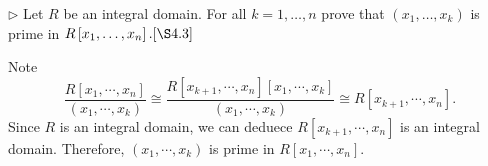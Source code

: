 \documentclass[12pt,letterpaper,boxed]{hmcpset}
\begin{document}
\begin{problem}[4.13]
$\triangleright$ Let $R$ be an integral domain. For all $k=1, \ldots, n$ prove that $\left(x_{1}, \ldots, x_{k}\right)$ is prime in $R\left[x_{1}, \ldots, x_{n}\right] .[\S 4.3]$
\end{problem}
\begin{solution}
	Note
	\[
	\frac{R\left[x_{1}, \cdots, x_{n}\right]}{\left(x_{1}, \cdots, x_{k}\right)}\cong \frac{R\left[x_{k+1},\cdots,x_n\right]\left[x_{1}, \cdots, x_{k}\right]}{\left(x_{1}, \cdots, x_{k}\right)}\cong R\left[x_{k+1},\cdots,x_n\right].
	\]
	Since $R$ is an integral domain, we can deduece $R\left[x_{k+1},\cdots,x_n\right]$ is an integral domain. Therefore, $\left(x_{1}, \cdots, x_{k}\right)$ is prime in $R\left[x_{1}, \cdots, x_{n}\right]$.
\end{solution}
\end{document}
